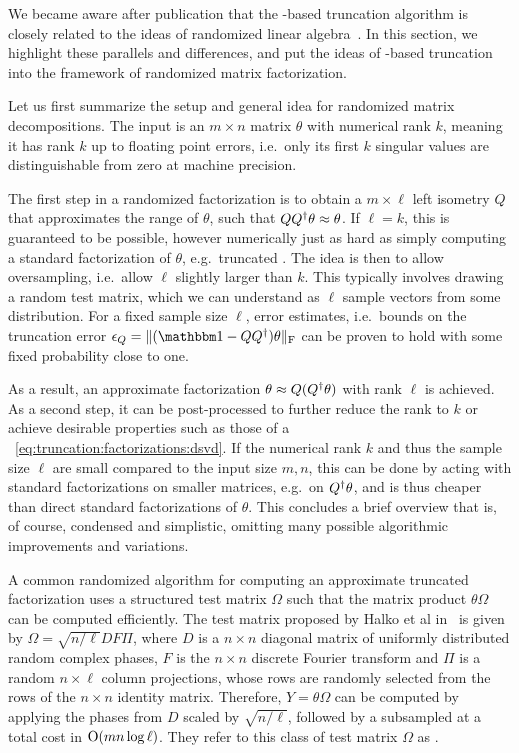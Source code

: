 We became aware after publication that the -based truncation algorithm is closely related to the ideas of randomized linear algebra~\cite{halko2010}.
%
In this section, we highlight these parallels and differences, and put the ideas of -based truncation into the framework of randomized matrix factorization.

Let us first summarize the setup and general idea for randomized matrix decompositions.
%
The input is an $m \times n$ matrix $\theta$ with numerical rank $k$, meaning it has rank $k$ up to floating point errors, i.e.~only its first $k$ singular values are distinguishable from zero at machine precision.

The first step in a randomized factorization is to obtain a $m \times \ell$ left isometry $Q$ that approximates the range of $\theta$, such that $Q Q^\dagger \theta \approx \theta$.
%
If $\ell = k$, this is guaranteed to be possible, however numerically just as hard as simply computing a standard factorization of $\theta$, e.g.~truncated .
%
The idea is then to allow oversampling, i.e.~allow $\ell$ slightly larger than $k$.
%
This typically involves drawing a random test matrix, which we can understand as $\ell$ sample vectors from some distribution.
%
For a fixed sample size $\ell$, error estimates, i.e.~bounds on the truncation error $\epsilon_Q = \Fnorm{(\eye - Q \hconj{Q}) \theta}$ can be proven to hold with some fixed probability close to one.

As a result, an approximate factorization $\theta \approx Q (Q^\dagger\theta)$ with rank $\ell$ is achieved.
%
As a second step, it can be post-processed to further reduce the rank to $k$ or achieve desirable properties such as those of a ~\eqref{eq:truncation:factorizations:dsvd}.
%
If the numerical rank $k$ and thus the sample size $\ell$ are small compared to the input size $m, n$, this can be done by acting with standard factorizations on smaller matrices, e.g.~on $Q^\dagger\theta$, and is thus cheaper than direct standard factorizations of $\theta$.
%
This concludes a brief overview that is, of course, condensed and simplistic, omitting many possible algorithmic improvements and variations.



A common randomized algorithm for computing an approximate truncated factorization uses a structured test matrix $\Omega$ such that the matrix product $\theta\Omega$ can be computed efficiently.
%
The test matrix proposed by Halko et al in~\cite[chpt.~4]{halko2010} is given by $\Omega = \sqrt{n / \ell} D F \Pi$, where $D$ is a $n \times n$ diagonal matrix of uniformly distributed random complex phases, $F$ is the $n \times n$ discrete Fourier transform and $\Pi$ is a random $n \times \ell$ column projections, whose rows are randomly selected from the rows of the $n \times n$ identity matrix.
%
Therefore, $Y = \theta\Omega$ can be computed by applying the phases from $D$ scaled by $\sqrt{n/\ell}$, followed by a subsampled  \cite{woolfe2008} at a total cost in $\mathrm{O}(mn\log\ell)$.
%
They refer to this class of test matrix $\Omega$ as .

